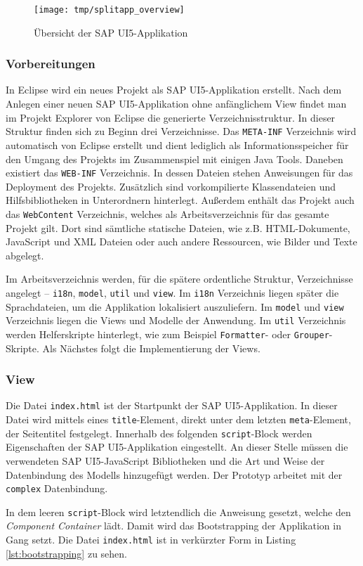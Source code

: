 \vspace{1em}
\begin{figure}[htb]
  \centering
  \texttt{[image: tmp/splitapp\_overview]}
  \caption[Übersicht der SAP UI5-Applikation]{Übersicht der SAP UI5-Applikation \cite{SAPSplitApp}}
  \label{fig:splitappoverview}
\end{figure}

\subsubsection{Vorbereitungen}
In Eclipse wird ein neues Projekt als SAP UI5-Applikation erstellt. Nach dem Anlegen einer neuen SAP UI5-Applikation ohne anfänglichem View findet man im Projekt Explorer von Eclipse die generierte Verzeichnisstruktur. In dieser Struktur finden sich zu Beginn drei Verzeichnisse. Das \texttt{META-INF} Verzeichnis wird automatisch von Eclipse erstellt und dient lediglich als Informationsspeicher für den Umgang des Projekts im Zusammenspiel mit einigen Java Tools. Daneben existiert das \texttt{WEB-INF} Verzeichnis. In dessen Dateien stehen Anweisungen für das Deployment des Projekts. Zusätzlich sind vorkompilierte Klassendateien und Hilfsbibliotheken in Unterordnern hinterlegt. Außerdem enthält das Projekt auch das \texttt{WebContent} Verzeichnis, welches als Arbeitsverzeichnis für das gesamte Projekt gilt. Dort sind sämtliche statische Dateien, wie z.B. HTML-Dokumente, JavaScript und XML Dateien oder auch andere Ressourcen, wie Bilder und Texte abgelegt.\par Im Arbeitsverzeichnis werden, für die spätere ordentliche Struktur, Verzeichnisse angelegt -- \texttt{i18n}, \texttt{model}, \texttt{util} und \texttt{view}. Im \texttt{i18n} Verzeichnis liegen später die Sprachdateien, um die Applikation lokalisiert auszuliefern. Im \texttt{model} und \texttt{view} Verzeichnis liegen die Views und Modelle der Anwendung. Im \texttt{util} Verzeichnis werden Helferskripte hinterlegt, wie zum Beispiel \texttt{Formatter}- oder \texttt{Grouper}-Skripte. Als Nächstes folgt die Implementierung der Views.

\subsubsection{View}
Die Datei \texttt{index.html} ist der Startpunkt der SAP UI5-Applikation. In dieser Datei wird mittels eines \texttt{title}-Element, direkt unter dem letzten \texttt{meta}-Element, der Seitentitel festgelegt. Innerhalb des folgenden \texttt{script}-Block werden Eigenschaften der SAP UI5-Applikation eingestellt. An dieser Stelle müssen die verwendeten SAP UI5-JavaScript Bibliotheken und die Art und Weise der Datenbindung des Modells hinzugefügt werden. Der Prototyp arbeitet mit der \texttt{complex} Datenbindung.\par In dem leeren \texttt{script}-Block wird letztendlich die Anweisung gesetzt, welche den \textit{Component Container} lädt. Damit wird das Bootstrapping der Applikation in Gang setzt. Die Datei \texttt{index.html} ist in verkürzter Form in Listing \ref{lst:bootstrapping} zu sehen.
	
